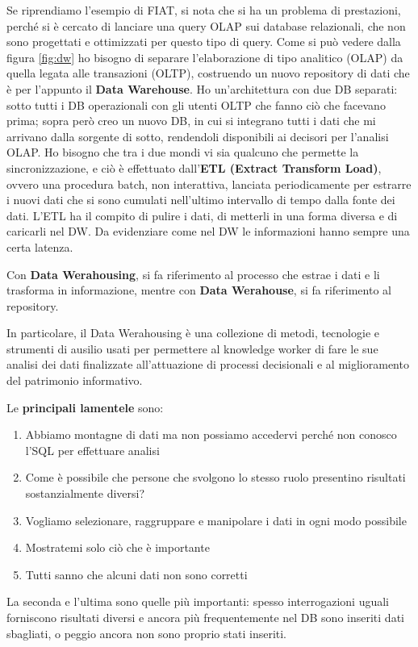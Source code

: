 Se riprendiamo l’esempio di FIAT, si nota che si ha un problema di prestazioni, perché si è cercato di lanciare una query OLAP sui database relazionali, che non sono progettati e ottimizzati per questo tipo di query. Come si può vedere dalla figura \ref{fig:dw} ho bisogno di separare l’elaborazione di tipo analitico (OLAP) da quella legata alle transazioni (OLTP), costruendo un nuovo repository di dati che è per l’appunto il \textbf{Data Warehouse}. Ho un’architettura con due DB separati: sotto tutti i DB operazionali con gli utenti OLTP che fanno ciò che facevano prima; sopra però creo un nuovo DB, in cui  si integrano tutti i dati che mi arrivano dalla sorgente di sotto, rendendoli disponibili ai decisori per l’analisi OLAP. Ho bisogno che tra i due mondi vi sia qualcuno che permette la sincronizzazione, e ciò è effettuato dall’\textbf{ETL (Extract Transform Load)}, ovvero una procedura batch, non interattiva, lanciata periodicamente per estrarre i nuovi dati che si sono cumulati nell’ultimo intervallo di tempo dalla fonte dei dati. L'ETL ha il compito di pulire i dati, di metterli in una forma diversa e di caricarli nel DW. Da evidenziare come nel DW le informazioni hanno sempre una certa latenza.

Con \textbf{Data Werahousing}, si fa riferimento al processo che estrae i dati e li trasforma in informazione, mentre con \textbf{Data Werahouse}, si fa riferimento al repository.

In particolare, il Data Werahousing è una collezione di metodi, tecnologie e strumenti di ausilio usati per permettere al knowledge worker di fare le sue analisi dei dati finalizzate all’attuazione di processi decisionali e al miglioramento del patrimonio informativo. 

Le \textbf{principali lamentele} sono:
\begin{enumerate}
	\item 
	Abbiamo montagne di dati ma non possiamo accedervi perché non conosco l’SQL per effettuare analisi
	\item 
	Come è possibile che persone che svolgono lo stesso ruolo presentino risultati sostanzialmente diversi?
	\item 
	Vogliamo selezionare, raggruppare e manipolare i dati in ogni modo possibile
	\item 
	Mostratemi solo ciò che è importante
	\item 
	Tutti sanno che alcuni dati non sono corretti
\end{enumerate}

La seconda e l’ultima sono quelle più importanti: spesso interrogazioni uguali forniscono risultati diversi e ancora più frequentemente nel DB sono inseriti dati sbagliati, o peggio ancora non sono proprio stati inseriti.
